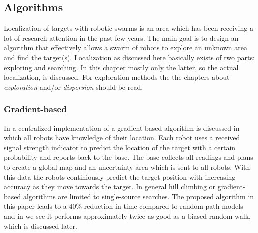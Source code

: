 \subsection{Algorithms}
Localization of targets with robotic swarms is an area which has been receiving a lot of research attention in the past few years. 
The main goal is to design an algorithm that effectively allows a swarm of robots to explore an unknown area and find the target(s).
Localization as discussed here basically exists of two parts: exploring and searching.
In this chapter mostly only the latter, so the actual localization, is discussed.
For exploration methods the the chapters about \emph{exploration} and/or \emph{dispersion} should be read.

	\subsubsection{Gradient-based}
		In \cite{zhang2009gradient} a centralized implementation of a gradient-based algorithm is discussed in which all robots have knowledge of their location.
		Each robot uses a received signal strength indicator to predict the location of the target with a certain probability and reports back to the base.
		The base collects all readings and plans to create a global map and an uncertainty area which is sent to all robots.
		With this data the robots continiously predict the target position with increasing accuracy as they move towards the target.
		In general hill climbing or gradient-based algorithms are limited to single-source searches.
		The proposed algorithm in this paper leads to a 40\% reduction in time compared to random path models and in \cite{dhariwal2004bacterium} we see it performs approximately twice as good as a biased random walk, which is discussed later.

